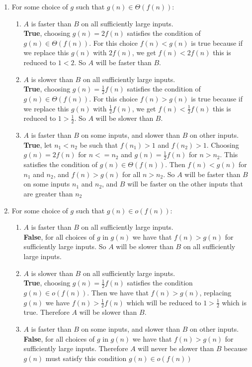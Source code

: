 \documentclass[11pt]{article}
\def\ans#1{{\color{ans}#1}}
\begin{document}
\begin{enumerate}
\item For some choice of $g$ such that $g(n) \in \Theta(f(n))$:
\begin{enumerate}
\item $A$ is faster than $B$ on all sufficiently large inputs. \\
\ans{
  \textbf{True}, choosing $g(n) = 2f(n)$ satisfies the condition of $g(n) \in \Theta(f(n))$.
  For this choice $f(n) < g(n)$ is true because if we replace this $g(n)$ with $2f(n)$, we 
  get $f(n) < 2f(n)$ this is reduced to $1 < 2$. So $A$ will be faster than $B$.
}
\item $A$ is slower than $B$ on all sufficiently large inputs. \\
\ans{
  \textbf{True}, choosing $g(n) = \frac{1}{2}f(n)$ satisfies the condition of $g(n) \in \Theta(f(n))$.
  For this choice $f(n) > g(n)$ is true because if we replace this $g(n)$ with $\frac{1}{2}f(n)$, we 
  get $f(n) < \frac{1}{2}f(n)$ this is reduced to $1 > \frac{1}{2}$. So $A$ will be slower than $B$.
}
\item $A$ is faster than $B$ on some inputs, and slower than $B$ on other inputs.\\
\ans{
  \textbf{True}, let $n_1 < n_2$ be such that $f(n_1) > 1$ and $f(n_2) > 1$. Choosing 
  $g(n) = 2f(n)$ for $n <= n_2$ and $g(n) = \frac{1}{2}f(n)$ for $n > n_2$.
  This satisfies the condition of $g(n) \in \Theta(f(n))$. Then $f(n) < g(n)$ for $n_1$ and $n_2$, 
  and $f(n) > g(n)$ for all $n > n_2$. So $A$ will be faster than $B$ on some inputs $n_1$ and $n_2$, 
  and $B$ will be faster on the other inputs that are greater than $n_2$
}
\end{enumerate}

\item For some choice of $g$ such that $g(n) \in o(f(n))$:

\begin{enumerate}
\item $A$ is faster than $B$ on all sufficiently large inputs.\\
\ans{
  \textbf{False}, for all choices of $g$ in $g(n)$ we have that $f(n) > g(n)$ for sufficiently
  large inputs. So $A$ will be slower than $B$ on all sufficiently large inputs.
}
\item $A$ is slower than $B$ on all sufficiently large inputs.\\
\ans{
  \textbf{True}, choosing $g(n) = \frac{1}{2}f(n)$ satisfies the condition $g(n) \in o(f(n))$. Then 
  we have that $f(n) > g(n)$, replacing $g(n)$ we have $f(n) > \frac{1}{2}f(n)$ which will be reduced 
  to $1 > \frac{1}{2}$ which is true. Therefore $A$ will be slower than $B$.
}
\item $A$ is faster than $B$ on some inputs, and slower than $B$ on other inputs.\\
\ans{
  \textbf{False}, for all choices of $g$ in $g(n)$ we have that $f(n) > g(n)$ for sufficiently
  large inputs. Therefore $A$ will never be slower than $B$ because $g(n)$ must satisfy this 
  condition $g(n) \in o(f(n))$
}
\end{enumerate}
\end{enumerate}
\end{document}
